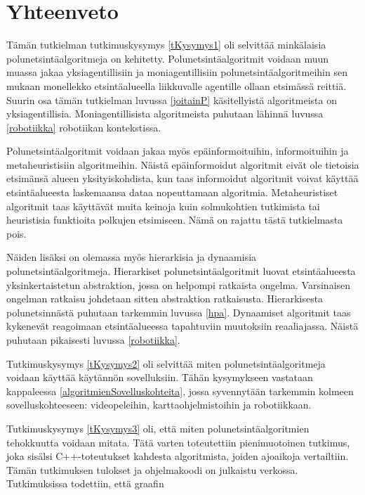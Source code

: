 \chapter{Yhteenveto}\label{yhteenveto}

Tämän tutkielman tutkimuskysymys \ref{tKysymys1} oli selvittää minkälaisia 
polunetsintäalgoritmeja on kehitetty. Polunetsintäalgoritmit voidaan muun 
muassa jakaa yksiagentillisiin ja moniagentillisiin polunetsintäalgoritmeihin 
sen mukaan monellekko etsintäalueella liikkuvalle agentille ollaan etsimässä 
reittiä. Suurin osa tämän tutkielman luvussa \ref{joitainP} käsitellyistä 
algoritmeista on yksiagentillisia. Moniagentillisista algoritmeista puhutaan 
lähinnä luvussa \ref{robotiikka} robotiikan kontekstissa. \par
	Polunetsintäalgoritmit voidaan jakaa myös epäinformoituihin, 
informoituihin ja metaheuristisiin algoritmeihin. Näistä epäinformoidut 
algoritmit eivät ole tietoisia etsimänsä alueen yksityiskohdista, kun taas 
informoidut algoritmit voivat käyttää etsintäalueesta laskemaansa dataa 
nopeuttamaan algoritmia. Metaheuristiset algoritmit taas käyttävät muita 
keinoja kuin solmukohtien tutkimista tai heuristisia funktioita polkujen 
etsimiseen.\cite{applSciLawande} Nämä on rajattu tästä tutkielmasta pois. \par
	Näiden lisäksi on olemassa myös hierarkisia ja dynaamisia 
polunetsintäalgoritmeja. Hierarkiset polunetsintäalgoritmit luovat 
etsintäalueesta yksinkertaistetun abstraktion, jossa on helpompi ratkaista 
ongelma. Varsinaisen ongelman ratkaisu johdetaan sitten abstraktion 
ratkaisusta.\cite{rda} Hierarkisesta polunetsinnästä puhutaan tarkemmin 
luvussa \ref{hpa}. Dynaamiset algoritmit taas kykenevät reagoimaan 
etsintäalueessa tapahtuviin muutoksiin reaaliajassa. Näistä puhutaan 
pikaisesti luvussa \ref{robotiikka}. \par
	Tutkimuskysymys \ref{tKysymys2} oli selvittää miten 
polunetsintäalgoritmeja voidaan käyttää käytännön sovelluksiin. Tähän 
kysymykseen vastataan kappaleessa \ref{algoritmienSovelluskohteita}, jossa 
syvennytään tarkemmin kolmeen sovelluskohteeseen: videopeleihin, 
karttaohjelmistoihin ja robotiikkaan. \par
	Tutkimuskysymys \ref{tKysymys3} oli, että miten 
polunetsintäalgoritmien tehokkuutta voidaan mitata. Tätä varten toteutettiin 
pienimuotoinen tutkimus, joka sisälsi C++-toteutukset kahdesta algoritmista, 
joiden ajoaikoja vertailtiin. Tämän tutkimuksen tulokset ja ohjelmakoodi 
on julkaistu verkossa.\cite{gt2} Tutkimuksissa todettiin, että graafin 
